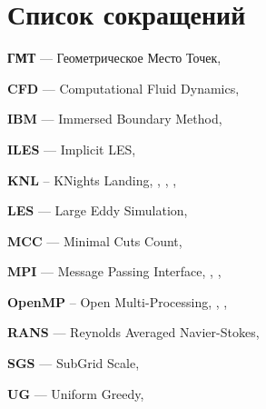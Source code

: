 \newpage

\section*{Список сокращений}

\textbf{ГМТ} --- Геометрическое Место Точек, \pageref{abbr:gmt}

\textbf{CFD} --- Computational Fluid Dynamics, \pageref{abbr:cfd}

\textbf{IBM} --- Immersed Boundary Method, \pageref{abbr:ibm}

\textbf{ILES} --- Implicit LES, \pageref{abbr:iles}

\textbf{KNL} -- KNights Landing, \pageref{abbr:knl}, \pageref{abbr:knl2}, \pageref{abbr:knl3}, \pageref{abbr:knl4}

\textbf{LES} --- Large Eddy Simulation, \pageref{abbr:les}

\textbf{MCC} --- Minimal Cuts Count, \pageref{abbr:mcc}

\textbf{MPI} --- Message Passing Interface, \pageref{abbr:mpi}, \pageref{abbr:mpi2}, \pageref{abbr:mpi3}

\textbf{OpenMP} -- Open Multi-Processing, \pageref{abbr:openmp}, \pageref{abbr:openmp2}, \pageref{abbr:openmp3}

\textbf{RANS} --- Reynolds Averaged Navier-Stokes, \pageref{abbr:rans}

\textbf{SGS} --- SubGrid Scale, \pageref{abbr:sgs}

\textbf{UG} --- Uniform Greedy, \pageref{abbr:ug}
